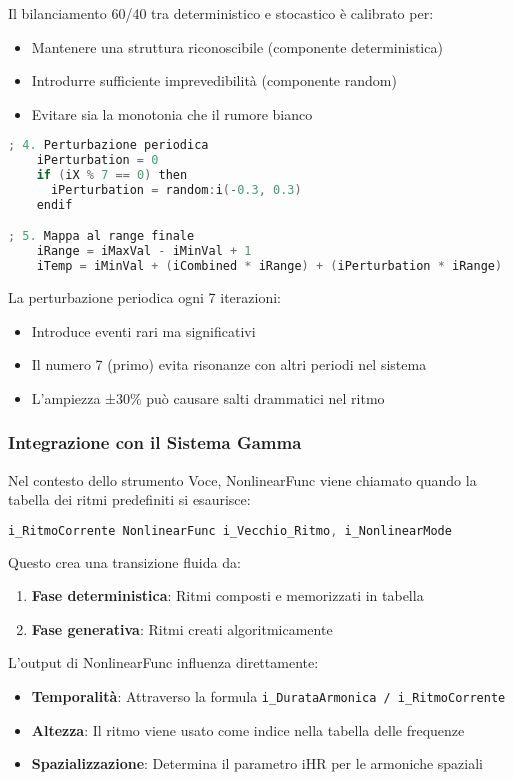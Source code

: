 Il bilanciamento 60/40 tra deterministico e stocastico è calibrato per:
\begin{itemize}
 \item Mantenere una struttura riconoscibile (componente deterministica)
 \item Introdurre sufficiente imprevedibilità (componente random)
 \item Evitare sia la monotonia che il rumore bianco
\end{itemize}

\begin{lstlisting}[language=C]
    ; 4. Perturbazione periodica
    iPerturbation = 0
    if (iX % 7 == 0) then 
      iPerturbation = random:i(-0.3, 0.3)
    endif

; 5. Mappa al range finale
    iRange = iMaxVal - iMinVal + 1
    iTemp = iMinVal + (iCombined * iRange) + (iPerturbation * iRange)
\end{lstlisting}

La perturbazione periodica ogni 7 iterazioni:
\begin{itemize}
 \item Introduce eventi rari ma significativi
 \item Il numero 7 (primo) evita risonanze con altri periodi nel sistema
 \item L'ampiezza ±30\% può causare salti drammatici nel ritmo
\end{itemize}
\subsubsection{Integrazione con il Sistema Gamma}
Nel contesto dello strumento Voce, NonlinearFunc viene chiamato quando la tabella dei ritmi predefiniti si esaurisce:

\begin{lstlisting}[language=C]
i_RitmoCorrente NonlinearFunc i_Vecchio_Ritmo, i_NonlinearMode
\end{lstlisting}

Questo crea una transizione fluida da:
\begin{enumerate}
    \item \textbf{Fase deterministica}: Ritmi composti e memorizzati in tabella
    \item \textbf{Fase generativa}: Ritmi creati algoritmicamente
\end{enumerate}
L'output di NonlinearFunc influenza direttamente:
\begin{itemize}
 \item \textbf{Temporalità}: Attraverso la formula \texttt{i\_DurataArmonica / i\_RitmoCorrente}
 \item \textbf{Altezza}: Il ritmo viene usato come indice nella tabella delle frequenze
 \item \textbf{Spazializzazione}: Determina il parametro iHR per le armoniche spaziali
\end{itemize}

